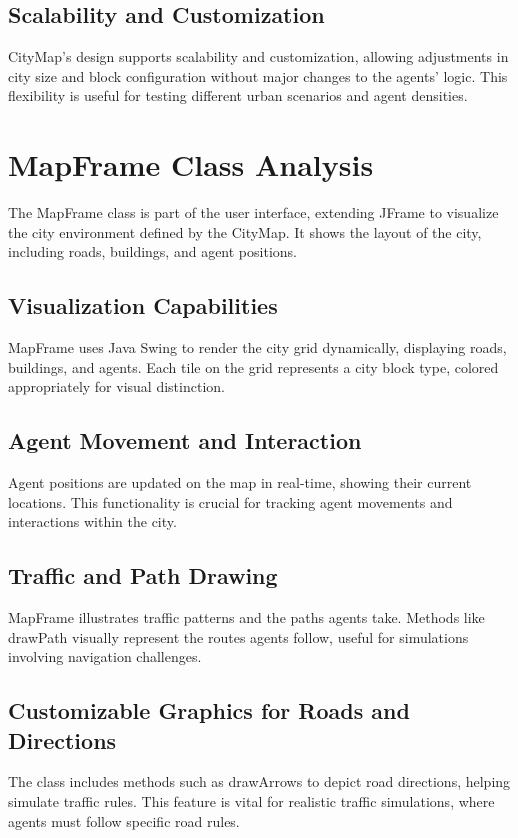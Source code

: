 \documentclass[conference]{IEEEtran}
\begin{document}
  \subsection{Scalability and Customization}
  CityMap's design supports scalability and customization, allowing adjustments in city size and block configuration without major changes to the agents' logic. This flexibility is useful for testing different urban scenarios and agent densities.
  
  
  \section{MapFrame Class Analysis}
  The MapFrame class is part of the user interface, extending JFrame to visualize the city environment defined by the CityMap. It shows the layout of the city, including roads, buildings, and agent positions.
  
  \subsection{Visualization Capabilities}
  MapFrame uses Java Swing to render the city grid dynamically, displaying roads, buildings, and agents. Each tile on the grid represents a city block type, colored appropriately for visual distinction.
  
  \subsection{Agent Movement and Interaction}
  Agent positions are updated on the map in real-time, showing their current locations. This functionality is crucial for tracking agent movements and interactions within the city.
  
  \subsection{Traffic and Path Drawing}
  MapFrame illustrates traffic patterns and the paths agents take. Methods like drawPath visually represent the routes agents follow, useful for simulations involving navigation challenges.
  
  \subsection{Customizable Graphics for Roads and Directions}
  The class includes methods such as drawArrows to depict road directions, helping simulate traffic rules. This feature is vital for realistic traffic simulations, where agents must follow specific road rules.
  
\end{document}
